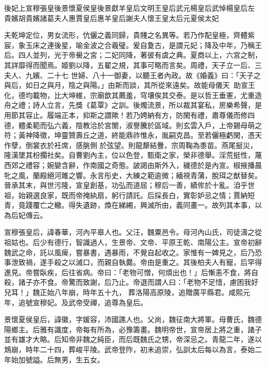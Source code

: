 
\begin{pinyinscope}

 後妃上宣穆張皇後景懷夏侯皇後景獻羊皇后文明王皇后武元楊皇后武悼楊皇后左
 貴嬪胡貴嬪諸葛夫人惠賈皇后惠羊皇后謝夫人懷王皇太后元夏侯太妃



 夫乾坤定位，男女流形，伉儷之義同歸，貴賤之名異等。若乃作配皇極，齊體紫宸，象玉床之連後星，喻金波之合羲璧。爰自夐古，是謂元妃；降及中年，乃稱王后。四人並列，光于帝嚳之宮；二妃同降，著彼有虞之典。夏商以上，六宮之制，其詳靡得而聞焉。姬劉以降，五翟之規，其事可略而言矣。周禮，天子立一后、三夫人、九嬪、二十七
 世婦、八十一御妻，以聽王者內政。故《婚義》曰：「天子之與后，如日之與月，陰之與陽。」由斯而談，其所從來遠矣。故能母儀天，助宣王化，德均載物，比大坤維，宗廟歆其薦羞，穹壤俟其交泰。是以哲王垂憲，尤重造舟之禮；詩人立言，先獎《葛覃》之訓。後燭流景，所以裁其宴私，房樂希聲，是用節其容止。履端正本，抑斯之謂歟！若乃娉納有方，防閑有禮，肅尊儀而修四德，體柔範而弘六義，陰教洽於宮闈，淑譽騰於區域。則玄雲入戶，上帝錫母萌之符；黃神降徵，坤靈贊壽丘之道，終能鼎祚惟永，胤嗣克昌。至若儷極虧閑，憑天作孽，倒裳衣於衽席，感朓側
 於弦望。則龍漦結釁，宗周鞠為黍苗。燕尾挻災，隆漢墜其枌擱社矣。自曹劉內主，位以色登，甄衛之家，榮非德舉。淫荒挺性，蔑西郊之禮容；婉孌含辭，作南國之奇態。詖謁由斯外入，穢德於是內宣。椒掖播晨牝之風，蘭殿絕河雎之響。永言彤史，大練之範逾微；緬視青蒲，脫珥之猷替矣。晉承其末，與世污隆，宣皇創基，功弘而道屈；穆后一善，績侔於十亂。洎乎世祖，始親選良家，既而帝掩紈扇，躬行請託。后採長白，實彰妒忌之情；賈納短青，竟踐覆亡之轍。得失遺跡，煥在綈緗，興滅所由，義同畫一。故列其本事，以為后妃傳云。



 宣穆張皇后，諱春華，河內平皋人也。父汪，魏粟邑令。母河內山氏，司徒濤之從祖姑也。后少有德行，智識過人，生景帝、文帝、平原王乾、南陽公主。宣帝初辭魏武之命，託以風痺，嘗暴書，遇暴雨，不覺自起收之。家惟有一婢見之，后乃恐事泄致禍，遂手殺之以滅口，而親自執爨。帝由是重之。其後柏夫人有寵，后罕得進見。帝嘗臥疾，后往省病。帝曰：「老物可憎，何煩出也！」后慚恚不食，將自殺，諸子亦不食。帝驚而致謝，后乃止。帝退而謂人曰：「老物不足惜，慮困我好兒耳！」魏正始八年崩，時年五十九，
 葬洛陽高原陵，追贈廣平縣君。咸熙元年，追號宣穆妃。及武帝受禪，追尊為皇后。



 景懷夏侯皇后，諱徽，字媛容，沛國譙人也。父尚，魏征南大將軍。母曹氏，魏德陽鄉主。后雅有識度，帝每有所為，必豫籌畫。魏明帝世，宣帝居上將之重，諸子並有雄才大略。后知帝非魏之純臣，而后既魏氏之甥，帝深忌之。青龍二年，遂以鴆崩，時年二十四，葬峻平陵。武帝登阼，初未追崇，弘訓太后每以為言，泰始二年始加號謚。后無男，生五女。




\end{pinyinscope}

